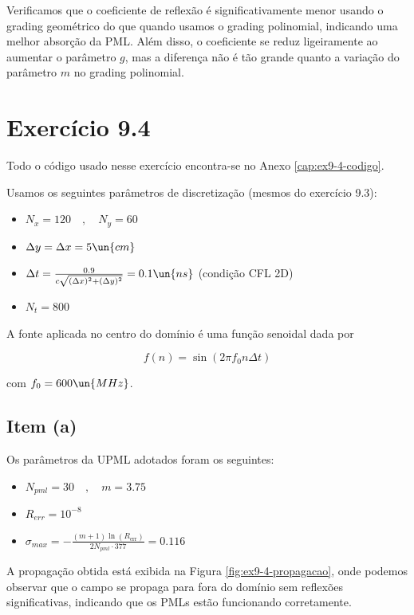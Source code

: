 Verificamos que o coeficiente de reflexão é significativamente menor usando o grading geométrico 
do que quando usamos o grading polinomial, indicando uma melhor absorção da PML.
Além disso, o coeficiente se reduz ligeiramente ao aumentar o parâmetro $g$, mas a diferença não é tão grande quanto a
 variação do parâmetro $m$ no grading polinomial.


\chapter{Exercício 9.4}

Todo o código usado nesse exercício encontra-se no Anexo \ref{cap:ex9-4-codigo}.

Usamos os seguintes parâmetros de discretização (mesmos do exercício 9.3):

\begin{itemize}
	\item $N_x = 120 \quad , \quad N_y = 60$
	\item $\Delta y = \Delta x = 5 \un{cm}$
	\item $\Delta t = \frac{0.9}{c \sqrt{(\Delta x)^{2} + (\Delta y)^{2}}} = 0.1 \un{ns} $ (condição CFL 2D)
	\item $N_t = 800$
\end{itemize}

A fonte aplicada no centro do domínio é uma função senoidal dada por 

\[ f(n) = \sin \left( 2\pi f_0 n \Delta t \right) \]

\noindent com $f_0 = 600 \un{MHz}$.

\section{Item (a)}

Os parâmetros da UPML adotados foram os seguintes:

\begin{itemize}
	\item $N_{pml} = 30 \quad , \quad m = 3.75$
	\item $R_{err} = 10^{-8}$
	\item $\sigma_{max} = -\frac{(m+1)\ln(R_{\mathrm{err}})}{2 N_{pml} \cdot 377} = 0.116$
\end{itemize}

A propagação obtida está exibida na Figura \ref{fig:ex9-4-propagacao}, 
onde podemos observar que o campo se propaga para fora do domínio sem reflexões significativas, 
indicando que os PMLs estão funcionando corretamente. 

